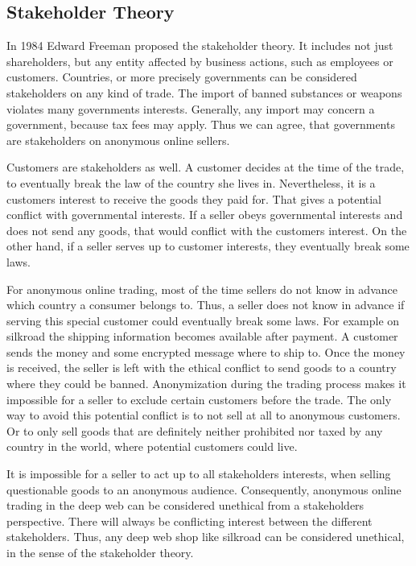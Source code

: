 \subsection{Stakeholder Theory}

In 1984 Edward Freeman proposed the stakeholder theory\cite{stakeholder}. It includes not just shareholders, but any entity affected by business actions, such as employees or customers. Countries, or more precisely governments can be considered stakeholders on any kind of trade. The import of banned substances or weapons violates many governments interests. Generally, any import may concern a government, because tax fees may apply. Thus we can agree, that governments are stakeholders on anonymous online sellers. 

Customers are stakeholders as well. A customer decides at the time of the trade, to eventually break the law of the country she lives in. Nevertheless, it is a customers interest to receive the goods they paid for. That gives a potential conflict with governmental interests. If a seller obeys governmental interests and does not send any goods, that would conflict with the customers interest. On the other hand, if a seller serves up to customer interests, they eventually break some laws.

For anonymous online trading, most of the time sellers do not know in advance which country a consumer belongs to. Thus, a seller does not know in advance if serving this special customer could eventually break some laws. For example on silkroad the shipping information becomes available after payment. A customer sends the money and some encrypted message where to ship to\cite{silkroad2013}. Once the money is received, the seller is left with the ethical conflict to send goods to a country where they could be banned. Anonymization during the trading process makes it impossible for a seller to exclude certain customers before the trade. The only way to avoid this potential conflict is to not sell at all to anonymous customers. Or to only sell goods that are definitely neither prohibited nor taxed by any country in the world, where potential customers could live.

It is impossible for a seller to act up to all stakeholders interests, when selling questionable goods to an anonymous audience. Consequently, anonymous online trading in the deep web can be considered unethical from a stakeholders perspective. There will always be conflicting interest between the different stakeholders. Thus, any deep web shop like silkroad can be considered unethical, in the sense of the stakeholder theory. 